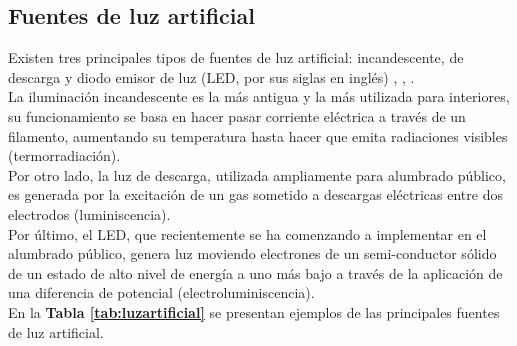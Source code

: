 \subsection{Fuentes de luz artificial}
\label{subsec:fuentesdeluz}

Existen tres principales tipos de fuentes de luz artificial: incandescente, de descarga y diodo emisor de luz (LED, por sus siglas en inglés) \citep{Solano2013b}, \citep{Eldvidge2010}, \citep{LibroCL}.\\

La iluminación incandescente es la más antigua y la más utilizada para interiores, su funcionamiento se basa en hacer pasar corriente eléctrica a través de un filamento, aumentando su temperatura hasta hacer que emita radiaciones visibles (termorradiación).\\

Por otro lado, la luz de descarga, utilizada ampliamente para alumbrado público, es generada por la excitación de un gas sometido a descargas eléctricas entre dos electrodos (luminiscencia).\\

Por último, el LED, que recientemente se ha comenzando a implementar en el alumbrado público, genera luz moviendo electrones de un semi-conductor sólido de un estado de alto nivel de energía a uno más bajo a través de la aplicación de una diferencia de potencial (electroluminiscencia).\\

 En la \textbf{Tabla \ref{tab:luzartificial}} se presentan ejemplos de las principales fuentes de luz artificial. 


